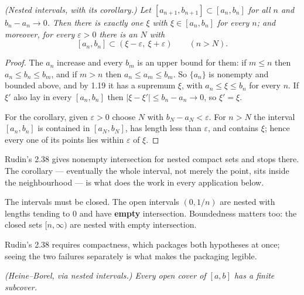 \emph{(Nested intervals, with its corollary.) Let $[a_{n+1},b_{n+1}] \subset
[a_n,b_n]$ for all $n$ and $b_n - a_n \to 0$. Then there is exactly one
$\xi$ with $\xi \in [a_n,b_n]$ for every $n$; and moreover, for every
$\varepsilon > 0$ there is an $N$ with}
\[ [a_n,b_n] \subset (\xi-\varepsilon,\ \xi+\varepsilon)
   \qquad (n > N). \]
\begin{proof}
The $a_n$ increase and every $b_m$ is an upper bound for them: if $m \le n$
then $a_n \le b_n \le b_m$, and if $m > n$ then $a_n \le a_m \le b_m$. So
$\{a_n\}$ is nonempty and bounded above, and by 1.19 it has a supremum
$\xi$, with $a_n \le \xi \le b_n$ for every $n$. If $\xi'$ also lay in every
$[a_n,b_n]$ then $|\xi-\xi'| \le b_n - a_n \to 0$, so $\xi' = \xi$.

For the corollary, given $\varepsilon>0$ choose $N$ with
$b_N - a_N < \varepsilon$. For $n > N$ the interval $[a_n,b_n]$ is contained
in $[a_N,b_N]$, has length less than $\varepsilon$, and contains $\xi$;
hence every one of its points lies within $\varepsilon$ of $\xi$.
\end{proof}

\noindent
Rudin's 2.38 gives nonempty intersection for nested compact sets and stops
there. The corollary --- eventually the whole interval, not merely the point,
sits inside the neighbourhood --- is what does the work in every application
below.

\begin{pitfall}
The intervals must be closed. The open intervals $(0,1/n)$ are nested with
lengths tending to $0$ and have \textbf{empty} intersection. Boundedness
matters too: the closed sets $[n,\infty)$ are nested with empty
intersection.

Rudin's 2.38 requires compactness, which packages both hypotheses at once;
seeing the two failures separately is what makes the packaging legible.
\end{pitfall}

\emph{(Heine--Borel, via nested intervals.) Every open cover of $[a,b]$ has
a finite subcover.}

